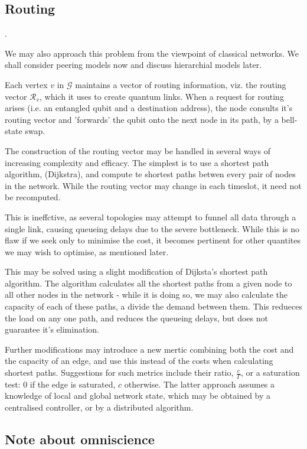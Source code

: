 \documentclass{amsart}
\begin{document}
    \subsection{Routing}.

    We may also approach this problem from the viewpoint of classical networks. We shall consider peering models now and discuss hierarchial models later. 

    Each vertex \(v\) in \(\mathcal{G}\) maintains a vector of routing information, viz. the routing vector \(\mathcal{R}_v\), which it uses to create quantum links. When a request for routing arises (i.e. an entangled qubit and a destination address), the node consults it's routing vector and 'forwards' the qubit onto the next node in its path, by a bell-state swap. 

    The construction of the routing vector may be handled in several ways of increasing complexity and efficacy. The simplest is to use a shortest path algorithm, (Dijkstra), and compute te shortest paths betwen every pair of nodes in the network. While the routing vector may change in each timeslot, it need not be recomputed. 
    
    This is ineffctive, as several topologies may attempt to funnel all data through a single link, causing queueing delays due to the severe bottleneck. While this is no flaw if we seek only to minimise the cost, it becomes pertinent for other quantites we may wish to optimise, as mentioned later.

    This may be solved using a slight modification of Dijksta's shortest path algorithm. The algorithm calculates all the shortest paths from a given node to all other nodes in the network - while it is doing so, we may also calculate the capacity of each of these paths, a divide the demand between them. This redueces the load on any one path, and reduces the queueing delays, but does not guarantee it's elimination.

    Further modifications may introduce a new mertic combining both the cost and the capacity of an edge, and use this instead of the costs when calculating shortest paths. Suggestions for such metrics include their ratio, \(\frac{c}{\Gamma}\), or a saturation test: 0 if the edge is saturated, \(c\) otherwise. The latter approach assumes a knowledge of local and global network state, which may be obtained by a centralised controller, or by a distributed algorithm. 

    \subsection{Note about omniscience}
\end{document}

